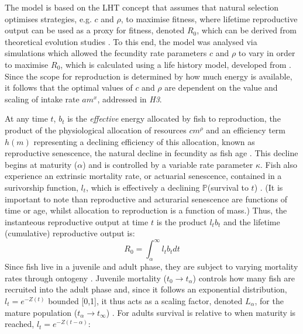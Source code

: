 \documentclass[a4paper]{article} %
\begin{document}
The model is based on the LHT concept that assumes that natural selection optimises strategies, e.g. $c$ and $\rho$, to maximise fitness, where lifetime reproductive output can be used as a proxy for fitness, denoted $R_0$, which can be derived from theoretical evolution studies \autocite{Charnov2001, stearns1992evolution}. To this end, the model was analysed via simulations which allowed the fecundity rate parameters $c$ and $\rho$ to vary in order to maximise $R_0$, which is calculated using a life history model, developed from \cite{Charnov2001}. Since the scope for reproduction is determined by how much energy is available, it follows that the optimal values of $c$ and $\rho$ are dependent on the value and scaling of intake rate $am^{x}$, addressed in \textit{H3}. 

At any time $t$, $b_{t}$ is the \textit{effective} energy allocated by fish to reproduction, the product of the physiological allocation of resources $cm^{\rho}$ and an efficiency term $h(m)$ representing a declining efficiency of this allocation, known as reproductive senescence, the natural decline in fecundity as fish age \autocite{Stearns2000, Benoit2018, Vrtilek2018}. This decline begins at maturity ($\alpha$) and is controlled by a variable rate parameter $\kappa$. Fish also experience an extrinsic mortality rate, or actuarial senescence, contained in a surivorship function, $l_t$, which is effectively a declining $\mathbb{P}$(survival to $t$) \autocite{Beverton1959, Peterson1984, Charnov1993,Walters1993, Charnov2001, Benoit2018, Laird2010, Reznick2002, Reznick2006}. (It is important to note than reproductive and acturarial senescence are functions of time or age, whilst allocation to reproduction is a function of mass.) Thus, the instanteous reproductive output at time $t$ is the product $l_{t}b_{t}$ and the lifetime (cumulative) reproductive output is:
\begin{equation}
    R_{0} = \int_{\alpha}^{\infty}l_{t}b_{t} dt
\end{equation}
Since fish live in a juvenile and adult phase, they are subject to varying mortality rates through ontogeny \autocite{Charnov2001}. Juvenile mortality ($t_0 \rightarrow t_{\alpha}$) controls how many fish are recruited into the adult phase and, since it follows an exponential distribution, $l_t = e^{-Z(t)}$ bounded [0,1], it thus acts as a scaling factor, denoted $L_{\alpha}$, for the mature population ($t_{\alpha} \rightarrow t_{\infty}$) \autocite{Charnov1990-agematurity}. For adults survival is relative to when maturity is reached, $l_{t} = e^{-Z(t-\alpha)}$:
\end{document}
